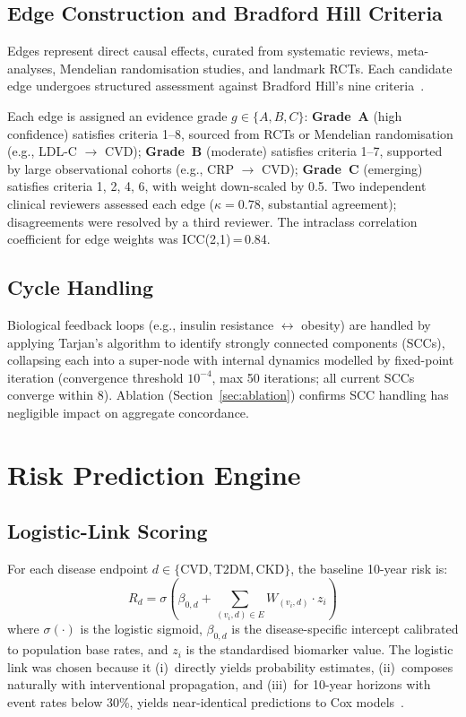 \documentclass[runningheads]{llncs}
\begin{document}
\subsection{Edge Construction and Bradford Hill Criteria}
\label{sec:edges}

Edges represent direct causal effects, curated from systematic
reviews, meta-analyses, Mendelian randomisation studies, and landmark
RCTs.  Each candidate edge undergoes structured assessment against
Bradford Hill's nine criteria~\cite{hill1965environment}.

Each edge is assigned an evidence grade $g \in \{A, B, C\}$:
\textbf{Grade~A} (high confidence) satisfies criteria 1--8, sourced
from RCTs or Mendelian randomisation (e.g., LDL-C $\rightarrow$ CVD);
\textbf{Grade~B} (moderate) satisfies criteria 1--7, supported by
large observational cohorts (e.g., CRP $\rightarrow$ CVD);
\textbf{Grade~C} (emerging) satisfies criteria 1, 2, 4, 6, with
weight down-scaled by 0.5.  Two independent clinical reviewers
assessed each edge ($\kappa = 0.78$, substantial agreement);
disagreements were resolved by a third reviewer.  The intraclass
correlation coefficient for edge weights was ICC(2,1)\,=\,0.84.

\subsection{Cycle Handling}\label{sec:cycles}

Biological feedback loops (e.g., insulin resistance
$\leftrightarrow$ obesity) are handled by applying Tarjan's algorithm
to identify strongly connected components (SCCs), collapsing each into
a super-node with internal dynamics modelled by fixed-point iteration
(convergence threshold $10^{-4}$, max 50 iterations; all current SCCs
converge within 8).  Ablation (Section~\ref{sec:ablation}) confirms
SCC handling has negligible impact on aggregate concordance.

\section{Risk Prediction Engine}\label{sec:risk}

\subsection{Logistic-Link Scoring}\label{sec:logistic}

For each disease endpoint $d \in \{\text{CVD}, \text{T2DM}, \text{CKD}\}$,
the baseline 10-year risk is:
\begin{equation}\label{eq:risk}
R_d = \sigma\!\left(\beta_{0,d} + \sum_{(v_i, d) \in E} W_{(v_i,d)} \cdot z_i\right)
\end{equation}
where $\sigma(\cdot)$ is the logistic sigmoid, $\beta_{0,d}$ is the
disease-specific intercept calibrated to population base rates, and
$z_i$ is the standardised biomarker value.  The logistic link was
chosen because it (i)~directly yields probability estimates, (ii)~composes
naturally with interventional propagation, and (iii)~for 10-year horizons
with event rates below 30\%, yields near-identical predictions to Cox
models~\cite{dagostino2008framingham}.
\end{document}
